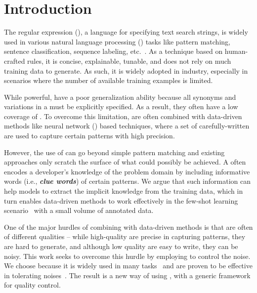 \section{Introduction}


The regular expression (\RE), a language for specifying text search strings, is widely used in various natural language processing (\NLP)
tasks like pattern matching, sentence classification, sequence labeling, etc.~\cite{chang2014tokensregex}.
As a technique based on human-crafted rules, it is concise, explainable, tunable, and does not rely on much training data to generate. As
such, it is widely adopted in industry, especially in scenarios where the number of available training examples is limited.

While powerful, \REs have a poor generalization ability because all synonyms and variations in a \RE must be explicitly specified. As a
result, they often have a low coverage of . To overcome this limitation, \REs are often combined with data-driven methods like neural
network (\NN) based techniques, where a set of carefully-written \REs are used to capture certain patterns with high precision.

However, the use of \REs can go beyond simple pattern matching and existing approaches only scratch the surface of what could possibly be
achieved. A \RE often encodes a developer's knowledge of the problem domain by including informative words (i.e., \textbf{\textit{clue
words}}) of certain patterns. We argue that such information can help models to extract the implicit knowledge from the training data,
which in turn enables data-driven methods to work effectively in the few-shot learning scenario~\cite{gc2015big} with a small volume of
annotated data.


One of the major hurdles of combining \REs with data-driven methods is that \REs are often of different qualities -- while high-quality
\REs are precise in capturing patterns, they are hard to generate, and although low quality \REs are easy to write, they can be noisy. This
work seeks to overcome this hurdle by employing \NNs to control the noise. We choose \NNs because it is widely used in many \NLP
tasks~\cite{goldberg2017neural} and are proven to be effective in tolerating noises~\cite{xie2016disturblabel}. The result is a new way of
using \REs, with a generic framework for quality control.

